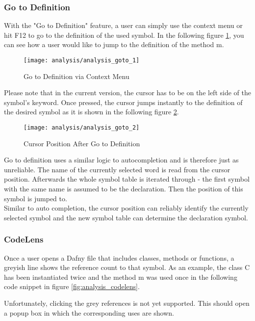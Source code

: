 \subsubsection{Go to Definition}
With the "Go to Definition" feature, a user can simply use the context menu or hit F12 to go to the definition of the used symbol.
In the following figure \ref{fig:analysis_goto_1}, you can see how a user would like to jump to the definition of the method m.

\begin{figure}[H]
    \centering
    \texttt{[image: analysis/analysis\_goto\_1]}
    \caption{Go to Definition via Context Menu}
    \label{fig:analysis_goto_1}
\end{figure}

Please note that in the current version, the cursor has to be on the left side of the symbol's keyword. Once pressed, the cursor jumps instantly to the definition of the desired symbol as it is shown in the following figure \ref{fig:analysis_goto_2}.

\begin{figure}[H]
    \centering
    \texttt{[image: analysis/analysis\_goto\_2]}
    \caption{Cursor Position After Go to Definition}
    \label{fig:analysis_goto_2}
\end{figure}

Go to definition uses a similar logic to autocompletion and is therefore just as unreliable.
The name of the currently selected word is read from the cursor position.
Afterwards the whole symbol table is iterated through - the first symbol with the same name is assumed to be the declaration.
Then the position of this symbol is jumped to. \\

Similar to auto completion, the cursor position can reliably identify the currently selected symbol and the new symbol table can determine the declaration symbol.

\subsubsection{CodeLens}
Once a user opens a Dafny file that includes classes, methods or functions, a greyish line shows the reference count to that symbol. As an example, the class C has been instantiated twice and the method m was used once in the following code snippet in figure \ref{fig:analysis_codelens}.

Unfortunately, clicking the grey references is not yet supported. This should open a popup box in which the corresponding uses are shown.

